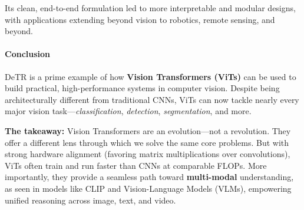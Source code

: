 \begin{enrichment}
\begin{enrichment}
		\noindent
		Its clean, end-to-end formulation led to more interpretable and modular designs, with applications extending beyond vision to robotics, remote sensing, and beyond.
		
		\paragraph{Conclusion}
		DeTR is a prime example of how \textbf{Vision Transformers (ViTs)} can be used to build practical, high-performance systems in computer vision. Despite being architecturally different from traditional CNNs, ViTs can now tackle nearly every major vision task—\textit{classification}, \textit{detection}, \textit{segmentation}, and more.
		
		\medskip
		
		\noindent
		\textbf{The takeaway:} Vision Transformers are an evolution—not a revolution. They offer a different lens through which we solve the same core problems. But with strong hardware alignment (favoring matrix multiplications over convolutions), ViTs often train and run faster than CNNs at comparable FLOPs. More importantly, they provide a seamless path toward \textbf{multi-modal} understanding, as seen in models like CLIP and Vision-Language Models (VLMs), empowering unified reasoning across image, text, and video.
	\end{enrichment}
\end{enrichment}

\newpage


